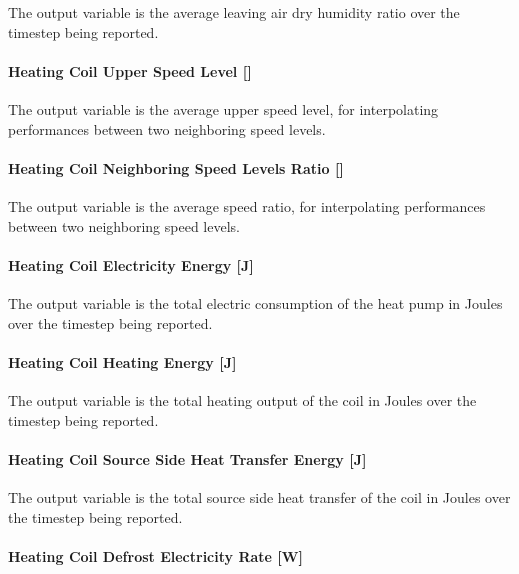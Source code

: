 The output variable is the average leaving air dry humidity ratio over the timestep being reported.

\paragraph{Heating Coil Upper Speed Level {[]}}\label{heating-coil-upper-speed-level}

The output variable is the average upper speed level, for interpolating performances between two neighboring speed levels.

\paragraph{Heating Coil Neighboring Speed Levels Ratio {[]}}\label{heating-coil-neighboring-speed-levels-ratio}

The output variable is the average speed ratio, for interpolating performances between two neighboring speed levels.

\paragraph{Heating Coil Electricity Energy {[}J{]}}\label{heating-coil-electric-energy-j-4}

The output variable is the total electric consumption of the heat pump in Joules over the timestep being reported.

\paragraph{Heating Coil Heating Energy {[}J{]}}\label{heating-coil-heating-energy-j-9}

The output variable is the total heating output of the coil in Joules over the timestep being reported.

\paragraph{Heating Coil Source Side Heat Transfer Energy {[}J{]}}\label{heating-coil-source-side-heat-transfer-energy-j-1}

The output variable is the total source side heat transfer of the coil in Joules over the timestep being reported.

\paragraph{Heating Coil Defrost Electricity Rate {[}W{]}}\label{heating-coil-defrost-electric-powerw}

